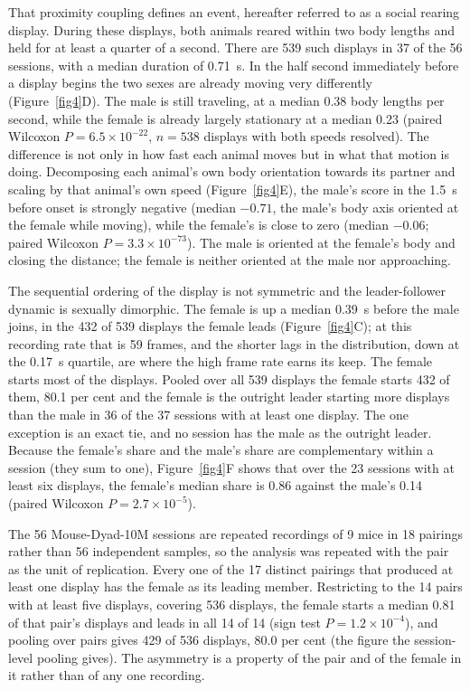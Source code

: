 \documentclass[pdflatex, sn-nature]{sn-jnl}
\theoremstyle{thmstyleone}%
\theoremstyle{thmstyletwo}%
\theoremstyle{thmstylethree}%
\begin{document}
That proximity coupling defines an event, hereafter referred to as a social rearing display. During these displays, both animals reared within two body lengths and held for at least a quarter of a second. There are 539 such displays in 37 of the 56 sessions, with a median duration of 0.71~s. In the half second immediately before a display begins the two sexes are already moving very differently (Figure~\ref{fig4}D). The male is still traveling, at a median 0.38 body lengths per second, while the female is already largely stationary at a median 0.23 (paired Wilcoxon $P = 6.5 \times 10^{-22}$, $n = 538$ displays with both speeds resolved). The difference is not only in how fast each animal moves but in what that motion is doing. Decomposing each animal's own body orientation towards its partner and scaling by that animal's own speed (Figure~\ref{fig4}E), the male's score in the 1.5~s before onset is strongly negative (median $-0.71$, the male's body axis oriented at the female while moving), while the female's is close to zero (median $-0.06$; paired Wilcoxon $P = 3.3 \times 10^{-73}$). The male is oriented at the female's body and closing the distance; the female is neither oriented at the male nor approaching.

The sequential ordering of the display is not symmetric and the leader-follower dynamic is sexually dimorphic. The female is up a median 0.39~s before the male joins, in the 432 of 539 displays the female leads (Figure~\ref{fig4}C); at this recording rate that is 59 frames, and the shorter lags in the distribution, down at the 0.17~s quartile, are where the high frame rate earns its keep. The female starts most of the displays. Pooled over all 539 displays the female starts 432 of them, 80.1 per cent and the female is the outright leader starting more displays than the male in 36 of the 37 sessions with at least one display. The one exception is an exact tie, and no session has the male as the outright leader. Because the female's share and the male's share are complementary within a session (they sum to one), Figure~\ref{fig4}F shows that over the 23 sessions with at least six displays, the female's median share is 0.86 against the male's 0.14 (paired Wilcoxon $P = 2.7 \times 10^{-5}$).

The 56 Mouse-Dyad-10M sessions are repeated recordings of 9 mice in 18 pairings rather than 56 independent samples, so the analysis was repeated with the pair as the unit of replication. Every one of the 17 distinct pairings that produced at least one display has the female as its leading member. Restricting to the 14 pairs with at least five displays, covering 536 displays, the female starts a median 0.81 of that pair's displays and leads in all 14 of 14 (sign test $P = 1.2 \times 10^{-4}$), and pooling over pairs gives 429 of 536 displays, 80.0 per cent (the figure the session-level pooling gives). The asymmetry is a property of the pair and of the female in it rather than of any one recording.
\end{document}
